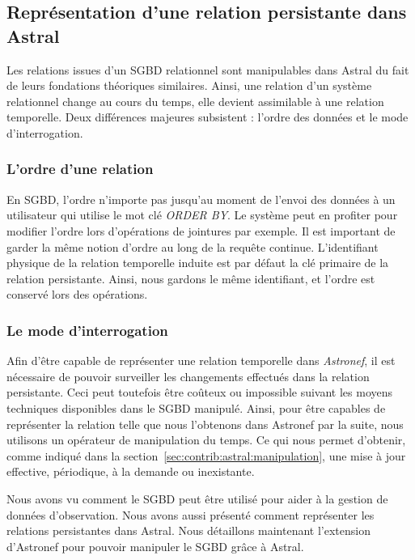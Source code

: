 \subsection{Représentation d'une relation persistante dans Astral}\label{sec:contrib:asteroid:theorie:astral}
Les relations issues d'un SGBD relationnel sont manipulables dans Astral du fait de leurs fondations théoriques similaires. Ainsi, une relation d'un système relationnel change au cours du temps, elle devient assimilable à une relation temporelle. Deux différences majeures subsistent : l'ordre des données et le mode d'interrogation.
\subsubsection{L'ordre d'une relation}
En SGBD, l'ordre n'importe pas jusqu'au moment de l'envoi des données à un utilisateur qui utilise le mot clé \textit{ORDER BY}. Le système peut en profiter pour modifier l'ordre lors d'opérations de jointures par exemple. Il est important de garder la même notion d'ordre au long de la requête continue. L'identifiant physique de la relation temporelle induite est par défaut la clé primaire de la relation persistante. Ainsi, nous gardons le même identifiant, et l'ordre est conservé lors des opérations.

\subsubsection{Le mode d'interrogation}
Afin d'être capable de représenter une relation temporelle dans \textit{Astronef}, il est nécessaire de pouvoir surveiller les changements effectués dans la relation persistante. Ceci peut toutefois être coûteux ou impossible suivant les moyens techniques disponibles dans le SGBD manipulé. Ainsi, pour être capables de représenter la relation telle que nous l'obtenons dans Astronef par la suite, nous utilisons un opérateur de manipulation du temps. Ce qui nous permet d'obtenir, comme indiqué dans la section~\ref{sec:contrib:astral:manipulation}, une mise à jour effective, périodique, à la demande ou inexistante.

Nous avons vu comment le SGBD peut être utilisé pour aider à la gestion de données d'observation. Nous avons aussi présenté comment représenter les relations persistantes dans Astral. Nous détaillons maintenant l'extension d'Astronef pour pouvoir manipuler le SGBD grâce à Astral.